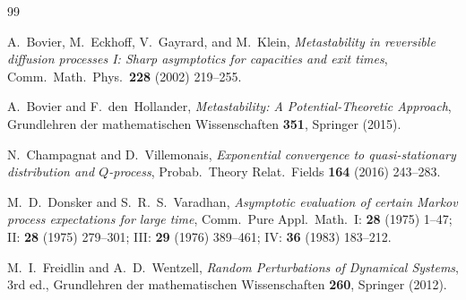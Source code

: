 \documentclass[11pt]{article}
\begin{document}
\begin{thebibliography}{99}

A.~Bovier, M.~Eckhoff, V.~Gayrard, and M.~Klein,
\emph{Metastability in reversible diffusion processes I:
Sharp asymptotics for capacities and exit times},
Comm.\ Math.\ Phys.\ \textbf{228} (2002) 219--255.

A.~Bovier and F.~den~Hollander,
\emph{Metastability: A Potential-Theoretic Approach},
Grundlehren der mathematischen Wissenschaften \textbf{351},
Springer (2015).

N.~Champagnat and D.~Villemonais,
\emph{Exponential convergence to quasi-stationary distribution
and $Q$-process},
Probab.\ Theory Relat.\ Fields \textbf{164} (2016) 243--283.

M.~D.~Donsker and S.~R.~S.~Varadhan,
\emph{Asymptotic evaluation of certain Markov process expectations
for large time},
Comm.\ Pure Appl.\ Math.\ I: \textbf{28} (1975) 1--47;
II: \textbf{28} (1975) 279--301;
III: \textbf{29} (1976) 389--461;
IV: \textbf{36} (1983) 183--212.

M.~I.~Freidlin and A.~D.~Wentzell,
\emph{Random Perturbations of Dynamical Systems},
3rd ed., Grundlehren der mathematischen Wissenschaften \textbf{260},
Springer (2012).

\end{thebibliography}
\end{document}
